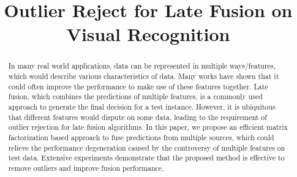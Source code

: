 \documentclass[letterpaper]{article}
\begin{document}
%



\title{Outlier Reject for Late Fusion on Visual Recognition}




\maketitle



\begin{abstract}
In many real world applications, data can be represented in multiple ways/features, which would describe various characteristics of data.
Many works have shown that it could often improve the performance to make use of these features together.
Late fusion, which combines the predictions of multiple features, is a commonly used approach to generate the final decision for a test instance.
However, it is ubiquitous that different features would dispute on some data, leading to the requirement of outlier rejection for late fusion algorithms.
In this paper, we propose an efficient matrix factorization based approach to fuse predictions from multiple sources, which could
relieve the performance degeneration caused by the controversy of multiple features on test data.
Extensive experiments demonstrate that the proposed method is effective to remove outliers and improve fusion performance.

\end{abstract}
\end{document}
